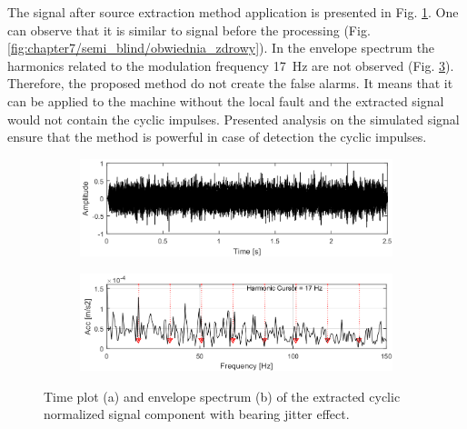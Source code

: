 %
The signal after source extraction method application is presented in Fig. \ref{fig:chapter7/semi_blind/time_zdrowy_filtr}. One can observe that it is similar to signal before the processing (Fig. \ref{fig:chapter7/semi_blind/obwiednia_zdrowy}). In the envelope spectrum the harmonics related to the modulation frequency 17~Hz are not observed (Fig. \ref{fig:chapter7/semi_blind/obwiednia_zdrowy_filtr}). Therefore, the proposed method do not create the false alarms. It means that it can be applied to the machine without the local fault and the extracted signal would not contain the cyclic impulses. Presented analysis on the simulated signal ensure that the method is powerful in case of detection the cyclic impulses. 
\begin{figure}
    \centering
    \begin{subfigure}[b]{0.8\textwidth}
        \centering
        \captionsetup{skip=0.01pt}
         \caption{}
        \includegraphics[width=\textwidth]{wykresy/chapter_application/semi_blind/sygnal_bez_impulsow_filtr.png}
        \label{fig:chapter7/semi_blind/time_zdrowy_filtr}
    \end{subfigure}

    \begin{subfigure}[b]{0.8\textwidth}
        \centering
        \captionsetup{skip=0.01pt}
        \caption{}
        \includegraphics[width=\textwidth]{wykresy/chapter_application/semi_blind/widmo_obwiedni_sygnal_bez_impulsow_filtr.png}
        \label{fig:chapter7/semi_blind/obwiednia_zdrowy_filtr}
    \end{subfigure}
    \caption{Time plot (a) and envelope spectrum (b) of the extracted cyclic normalized signal component with bearing jitter effect.}
\end{figure}
